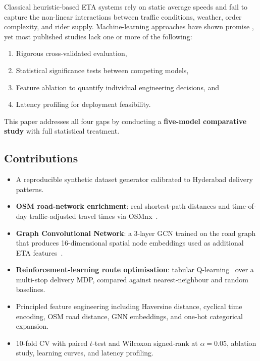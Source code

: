\documentclass[conference]{IEEEtran}
\begin{document}
Classical heuristic-based ETA systems rely on static average speeds and fail to
capture the non-linear interactions between traffic conditions, weather, order
complexity, and rider supply.  Machine-learning approaches have shown promise
\cite{wang2019deepeta,bai2021stg2seq}, yet most published studies lack one or
more of the following:
\begin{enumerate}
    \item Rigorous cross-validated evaluation,
    \item Statistical significance tests between competing models,
    \item Feature ablation to quantify individual engineering decisions, and
    \item Latency profiling for deployment feasibility.
\end{enumerate}

This paper addresses all four gaps by conducting a \textbf{five-model
comparative study} with full statistical treatment.

\subsection{Contributions}
\begin{itemize}
    \item A reproducible synthetic dataset generator calibrated to Hyderabad
          delivery patterns.
    \item \textbf{OSM road-network enrichment}: real shortest-path distances
          and time-of-day traffic-adjusted travel times via
          OSMnx~\cite{boeing2017osmnx}.
    \item \textbf{Graph Convolutional Network}: a 3-layer GCN trained on the
          road graph that produces 16-dimensional spatial node embeddings
          used as additional ETA features~\cite{kipf2017gcn}.
    \item \textbf{Reinforcement-learning route optimisation}: tabular
          Q-learning~\cite{sutton2018rl} over a multi-stop delivery MDP,
          compared against nearest-neighbour and random baselines.
    \item Principled feature engineering including Haversine distance,
          cyclical time encoding, OSM road distance, GNN embeddings, and
          one-hot categorical expansion.
    \item 10-fold CV with paired $t$-test and Wilcoxon signed-rank at
          $\alpha=0.05$, ablation study, learning curves, and latency
          profiling.
\end{itemize}
\end{document}
